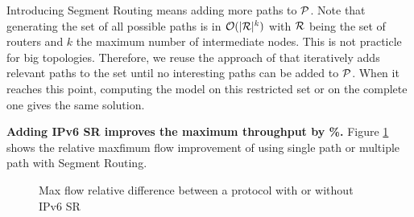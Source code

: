 Introducing Segment Routing means adding more paths to $\P$.
Note that generating the set of all possible paths is in $\O(|\R|^k)$
with $\R$ being the set of routers and $k$ the maximum number of intermediate nodes.
This is not practicle for big topologies.
Therefore, we reuse the approach of \cite{cg4sr} that iteratively adds relevant paths to the set
until no interesting paths can be added to $\P$.
When it reaches this point, computing the model on this restricted set or on the complete one
gives the same solution.

\textbf{Adding IPv6 SR improves the maximum throughput by \%.}
Figure \ref{fig:maxflow-theory} shows the relative maxfimum flow improvement of using single path or multiple path with Segment Routing. 

\begin{figure}
	\centering
	\caption{Max flow relative difference between a protocol with or without IPv6 SR}
	\label{fig:maxflow-theory}
\end{figure}







